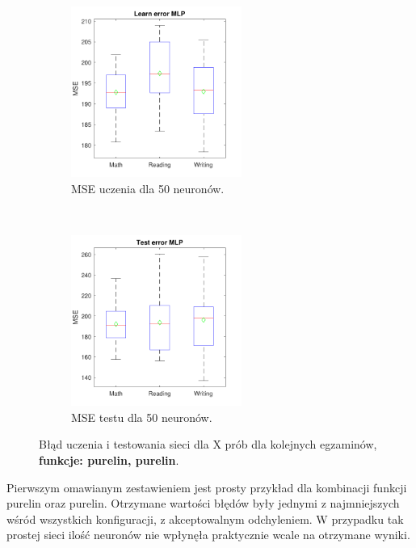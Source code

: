 \documentclass[12pt]{article}
\begin{document}
\begin{figure}[H]
\begin{subfigure}[t]{0.48\textwidth} 
\centering
\includegraphics[height=2.2in]{purelin_purelin_50_learnBoxplot.pdf}
\caption{MSE uczenia dla 50 neuronów.}
\end{subfigure}
~~
\begin{subfigure}[t]{0.48\textwidth} 
\centering
\includegraphics[height=2.2in]{purelin_purelin_50_testBoxplot.pdf}
\caption{MSE testu dla 50 neuronów.}
\end{subfigure}
\caption{Błąd uczenia i testowania sieci dla X prób dla kolejnych egzaminów, \textbf{funkcje: purelin, purelin}.}
\end{figure}

Pierwszym omawianym zestawieniem jest prosty przykład dla kombinacji funkcji purelin oraz purelin. Otrzymane wartości błędów były jednymi z najmniejszych wśród wszystkich konfiguracji, z akceptowalnym odchyleniem. W przypadku tak prostej sieci ilość neuronów nie wpłynęła praktycznie wcale na otrzymane wyniki.
\end{document}
